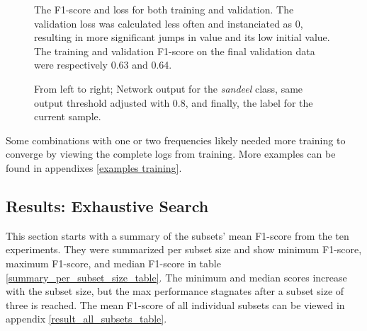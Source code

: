         \begin{figure}  
            \centering
            \qquad
            \caption[Loss and F1 score during training]{The F1-score and loss for both training and validation. The validation loss was calculated less often and instanciated as 0, resulting in more significant jumps in value and its low initial value. The training and validation F1-score on the final validation data were respectively 0.63 and 0.64.}%
            \label{loss_f1_duo_plot_fig}%
        \end{figure}
        \begin{figure}  
            \centering
            
            \caption[Example output, threshold and label]{From left to right; Network output for the \textit{sandeel} class, same output threshold adjusted with 0.8, and finally, the label for the current sample.}
          	\medskip 
            \label{sandeel_threshold_label}
        \end{figure}
    
    
     Some combinations with one or two frequencies likely needed more training to converge by viewing the complete logs from training. More examples can be found in appendixes \ref{examples training}.
    

\subsection{Results: Exhaustive Search}
    This section starts with a summary of the subsets' mean F1-score from the ten experiments. They were summarized per subset size and show minimum F1-score, maximum F1-score, and median F1-score in table \ref{summary_per_subset_size_table}. The minimum and median scores increase with the subset size, but the max performance stagnates after a subset size of three is reached. The mean F1-score of all individual subsets can be viewed in appendix \ref{result_all_subsets_table}. 


